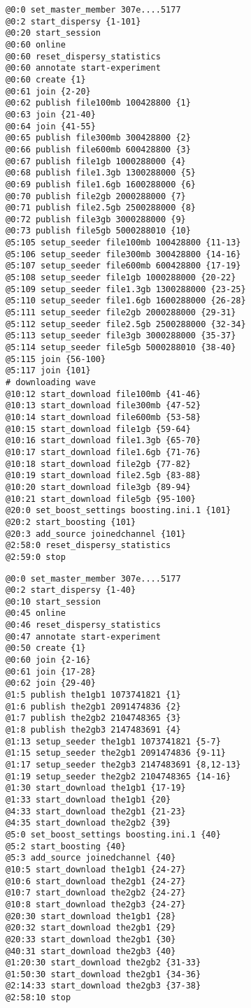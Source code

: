 \begin{appendices}
\begin{lstlisting}[caption={Scenario 3.}]
@0:0 set_master_member 307e....5177
@0:2 start_dispersy {1-101}
@0:20 start_session
@0:60 online
@0:60 reset_dispersy_statistics
@0:60 annotate start-experiment
@0:60 create {1}
@0:61 join {2-20}
@0:62 publish file100mb 100428800 {1}
@0:63 join {21-40}
@0:64 join {41-55}
@0:65 publish file300mb 300428800 {2}
@0:66 publish file600mb 600428800 {3}
@0:67 publish file1gb 1000288000 {4}
@0:68 publish file1.3gb 1300288000 {5}
@0:69 publish file1.6gb 1600288000 {6}
@0:70 publish file2gb 2000288000 {7}
@0:71 publish file2.5gb 2500288000 {8}
@0:72 publish file3gb 3000288000 {9}
@0:73 publish file5gb 5000288010 {10}
@5:105 setup_seeder file100mb 100428800 {11-13}
@5:106 setup_seeder file300mb 300428800 {14-16}
@5:107 setup_seeder file600mb 600428800 {17-19}
@5:108 setup_seeder file1gb 1000288000 {20-22}
@5:109 setup_seeder file1.3gb 1300288000 {23-25}
@5:110 setup_seeder file1.6gb 1600288000 {26-28}
@5:111 setup_seeder file2gb 2000288000 {29-31}
@5:112 setup_seeder file2.5gb 2500288000 {32-34}
@5:113 setup_seeder file3gb 3000288000 {35-37}
@5:114 setup_seeder file5gb 5000288010 {38-40}
@5:115 join {56-100}
@5:117 join {101}
# downloading wave
@10:12 start_download file100mb {41-46}
@10:13 start_download file300mb {47-52}
@10:14 start_download file600mb {53-58}
@10:15 start_download file1gb {59-64}
@10:16 start_download file1.3gb {65-70}
@10:17 start_download file1.6gb {71-76}
@10:18 start_download file2gb {77-82}
@10:19 start_download file2.5gb {83-88}
@10:20 start_download file3gb {89-94}
@10:21 start_download file5gb {95-100}
@20:0 set_boost_settings boosting.ini.1 {101}
@20:2 start_boosting {101}
@20:3 add_source joinedchannel {101}
@2:58:0 reset_dispersy_statistics
@2:59:0 stop
\end{lstlisting}

\begin{lstlisting}[caption={Scenario 4.}]
@0:0 set_master_member 307e....5177
@0:2 start_dispersy {1-40}
@0:10 start_session
@0:45 online
@0:46 reset_dispersy_statistics
@0:47 annotate start-experiment
@0:50 create {1}
@0:60 join {2-16}
@0:61 join {17-28}
@0:62 join {29-40}
@1:5 publish the1gb1 1073741821 {1}
@1:6 publish the2gb1 2091474836 {2}
@1:7 publish the2gb2 2104748365 {3}
@1:8 publish the2gb3 2147483691 {4}
@1:13 setup_seeder the1gb1 1073741821 {5-7}
@1:15 setup_seeder the2gb1 2091474836 {9-11}
@1:17 setup_seeder the2gb3 2147483691 {8,12-13}
@1:19 setup_seeder the2gb2 2104748365 {14-16}
@1:30 start_download the1gb1 {17-19}
@1:33 start_download the1gb1 {20}
@4:33 start_download the2gb1 {21-23}
@4:35 start_download the2gb2 {39}
@5:0 set_boost_settings boosting.ini.1 {40}
@5:2 start_boosting {40}
@5:3 add_source joinedchannel {40}
@10:5 start_download the1gb1 {24-27}
@10:6 start_download the2gb1 {24-27}
@10:7 start_download the2gb2 {24-27}
@10:8 start_download the2gb3 {24-27}
@20:30 start_download the1gb1 {28}
@20:32 start_download the2gb1 {29}
@20:33 start_download the2gb1 {30}
@40:31 start_download the2gb3 {40}
@1:20:30 start_download the2gb2 {31-33}
@1:50:30 start_download the2gb1 {34-36}
@2:14:33 start_download the2gb3 {37-38}
@2:58:10 stop
\end{lstlisting}

\end{appendices}